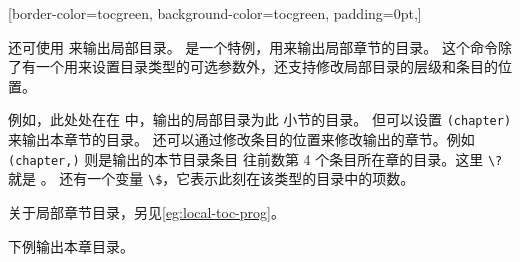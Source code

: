 \documentclass[twoside]{book}
\begin{document}
\startmulticolumns[2,ragged,outer-sep=0pt,framed=lfbox,overflow=0pt,
  adj-outer=-\dimeval{\paperwidth-3.4cm-\textwidth}]
\newcommand{\tochyperpage}{\toclink{\tocthepage}}
\hypersetup{hidelinks}
\makeatletter
{}
  {}
  {\noindent}
  {\fparbox{\linewidth}[border-color=tocgreen, background-color=tocgreen, padding={0pt,\fboxsep}]
    {\ccwd {} \color{white}\bfseries\large
      \strut \tocifnumbered{\tocthenumber\quad\kern-.3em}{}\tocthename
      \breakablefiller[space]\tochyperpage\par}\par }
  {\smallskip}
  {}
  {\smallskip
    \begin{list}{}{\ccwd {}\z@ 
      \itemindent-\ccwd \listparindent\itemindent
      \topsep\z@ \partopsep\z@ \itemsep\z@ \parsep\z@ \parskip\z@}}
  {\item \begingroup\color{tocgreen}\bfseries}
  {\tocifnumbered{\tocthenumber\quad}{}\tocthename\breakablefiller[space]%
    \makebox[1.5em][r]{\tochyperpage\;}\par }
  {\endgroup}
  {\end{list}}
  {}
  {\begingroup\color{black}\bfseries}
  {\tocifnumbered{\tocthenumber\quad}{}\tocthename\breakablefiller[dotted]%
    \makebox[1.5em][r]{\tochyperpage\;}\par }
  {\endgroup}
  {}
\makeatother 
\specifiedtoc
\stopmulticolumns



还可使用  来输出局部目录。
 是一个特例，用来输出局部章节的目录。
这个命令除了有一个用来设置目录类型的可选参数外，还支持修改局部目录的层级和条目的位置。

例如，此处处在在  中，输出的局部目录为此  小节的目录。
但可以设置 \texttt{(chapter)} 来输出本章节的目录。
还可以通过修改条目的位置来修改输出的章节。例如 
\texttt{(chapter,\string{})} 则是输出的本节目录条目
往前数第 4 个条目所在章的目录。这里 \verb|\?| 就是 。
还有一个变量 \verb|\$|，它表示此刻在该类型的目录中的项数。

关于局部章节目录，另见\cref{eg:local-toc-prog}。

下例输出本章目录。
\end{document}
